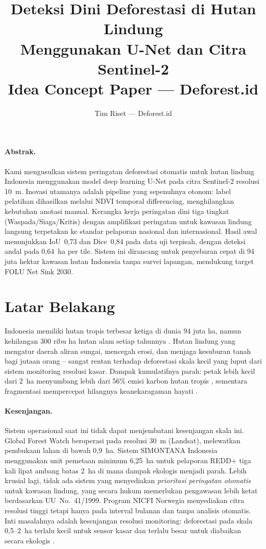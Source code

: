 \documentclass[10pt,a4paper,onecolumn]{article}
\title{\textbf{Deteksi Dini Deforestasi di Hutan Lindung \\
Menggunakan U-Net dan Citra Sentinel-2} \\
\small Idea Concept Paper --- Deforest.id}
\author{Tim Riset --- Deforest.id}
\date{}
\begin{document}
\maketitle
\thispagestyle{empty}

\paragraph{Abstrak.}
Kami mengusulkan sistem peringatan deforestasi otomatis untuk hutan
lindung Indonesia menggunakan model deep learning U-Net pada citra
Sentinel-2 resolusi 10~m. Inovasi utamanya adalah pipeline yang
sepenuhnya otonom: label pelatihan dihasilkan melalui NDVI temporal
differencing, menghilangkan kebutuhan anotasi manual. Kerangka kerja
peringatan dini tiga tingkat (Waspada/Siaga/Kritis) dengan amplifikasi
peringatan untuk kawasan lindung langsung terpetakan ke standar
pelaporan nasional dan internasional. Hasil awal menunjukkan IoU~0,73
dan Dice~0,84 pada data uji terpisah, dengan deteksi andal pada
0,64~ha per tile. Sistem ini dirancang untuk penyebaran cepat di
94 juta hektar kawasan hutan Indonesia tanpa survei lapangan,
mendukung target FOLU Net Sink 2030.

\section{Latar Belakang}
Indonesia memiliki hutan tropis terbesar ketiga di dunia
94 juta ha, namun kehilangan 300 ribu ha hutan alam
setiap tahunnya \cite{fao2022sofo}. Hutan lindung yang mengatur
daerah aliran sungai, mencegah erosi, dan menjaga kesuburan tanah
bagi jutaan orang -- sangat rentan terhadap deforestasi skala kecil
yang luput dari sistem monitoring resolusi kasar. Dampak kumulatifnya
parah: petak lebih kecil dari 2~ha menyumbang lebih dari 56\% emisi
karbon hutan tropis \cite{wahyuni2021dampak}, sementara fragmentasi
mempercepat hilangnya keanekaragaman hayati
\cite{taubert2018fragmentation}.

\paragraph{Kesenjangan.}
Sistem operasional saat ini tidak dapat menjembatani kesenjangan skala
ini. Global Forest Watch beroperasi pada resolusi 30~m (Landsat),
melewatkan pembukaan lahan di bawah 0,9~ha. Sistem SIMONTANA Indonesia
menggunakan unit pemetaan minimum 6,25~ha untuk pelaporan REDD+
\cite{unfccc2022indonesia} tiga kali lipat ambang batas 2~ha di
mana dampak ekologis menjadi parah. Lebih krusial lagi, tidak ada
sistem yang menyediakan \textit{prioritasi peringatan otomatis} untuk
kawasan lindung, yang secara hukum memerlukan pengawasan lebih ketat
berdasarkan UU~No.~41/1999. Program NICFI Norwegia menyediakan citra
resolusi tinggi tetapi hanya pada interval bulanan dan tanpa analisis
otomatis. Inti masalahnya adalah kesenjangan resolusi monitoring:
deforestasi pada skala 0,5--2~ha terlalu kecil untuk sensor kasar dan
terlalu besar untuk diabaikan secara ekologis \cite{hansen2013high,nicfi2020satellite}.
\end{document}
